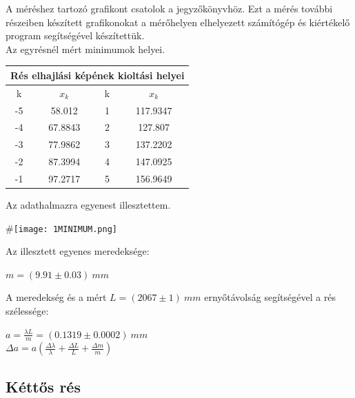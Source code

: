 \documentclass[a4paper,11pt]{article}
\begin{document}
A méréshez tartozó grafikont csatolok a jegyzőkönyvhöz. Ezt a mérés további részeiben készített grafikonokat a mérőhelyen elhelyezett számítógép és kiértékelő program segítségével készítettük. \\
Az egyrésnél mért minimumok helyei.
\begin{center}
\begin{tabular}{|c|c|c|c|} \hline
\multicolumn{4}{|c|}{Rés elhajlási képének kioltási helyei} \\ \hline
k & $x_k$ & k & $x_k$ \\ \hline
-5 & 58.012 & 1 & 117.9347 \\ \hline
-4 & 67.8843 & 2 & 127.807 \\ \hline
-3 & 77.9862 & 3 & 137.2202 \\ \hline
-2 & 87.3994 & 4 & 147.0925 \\ \hline
-1 & 97.2717 & 5 & 156.9649 \\ \hline
\end{tabular}
\end{center}
Az adathalmazra egyenest illesztettem.
\begin{center}
#\texttt{[image: 1MINIMUM.png]}
\end{center}

Az illesztett egyenes meredeksége:
\begin{center}
$m=(9.91\pm0.03)~mm$
\end{center}

A meredekség és a mért $L=(2067\pm1)~mm$ ernyőtávolság segítségével a rés szélessége:
\begin{center}
$a=\frac{\lambda L}{m}=(0.1319\pm0.0002)~mm$
\\
$\Delta a=a(\frac{\Delta \lambda}{\lambda}+\frac{\Delta L}{L}+\frac{\Delta m}{m})$
\end{center}

\subsection{Kéttős rés}
\end{document}

